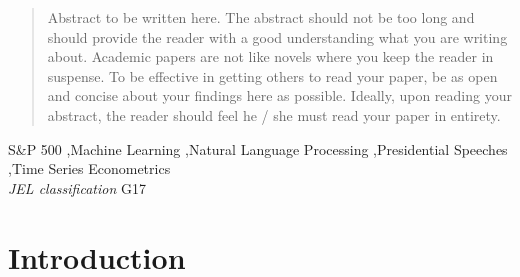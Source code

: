 \documentclass[11pt,preprint, authoryear]{elsarticle}
\numberwithin{equation}{section}
\numberwithin{figure}{section}
\numberwithin{table}{section}
\begin{document}
\begin{frontmatter}  %

\title{}


\begin{abstract}
\small{
Abstract to be written here. The abstract should not be too long and
should provide the reader with a good understanding what you are writing
about. Academic papers are not like novels where you keep the reader in
suspense. To be effective in getting others to read your paper, be as
open and concise about your findings here as possible. Ideally, upon
reading your abstract, the reader should feel he / she must read your
paper in entirety.
}
\end{abstract}

\vspace{1cm}


\begin{keyword}
\footnotesize{
S\&P 500 \sep Machine Learning \sep Natural Language Processing
\sep Presidential Speeches \sep Time Series Econometrics \\
\vspace{0.3cm}
}
\footnotesize{
\textit{JEL classification} G17
}
\end{keyword}



\vspace{0.5cm}

\end{frontmatter}



\pagestyle{fancy}
\chead{}
\rhead{}
\lfoot{}
\lhead{}
\cfoot{}


\headsep 35pt %




\hypertarget{introduction}{%
\section{\texorpdfstring{Introduction
\label{Introduction}}{Introduction }}\label{introduction}}
\end{document}
